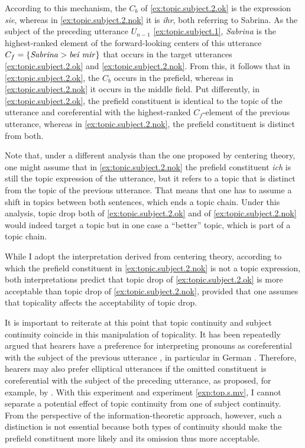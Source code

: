 According to this mechanism, the $C_b$ of \ref{ex:topic.subject.2.ok} is the expression \textit{sie}, whereas in \ref{ex:topic.subject.2.nok} it is \textit{ihr}, both referring to Sabrina.
As the subject of the preceding utterance $U_{n-1}$ \ref{ex:topic.subject.1}, \textit{Sabrina} is the highest-ranked element of the forward-looking centers of this utterance $C_f = \{\textrm{\textit{Sabrina}} > \textrm{\textit{bei mir}}\}$ that occurs in the target utterances \ref{ex:topic.subject.2.ok} and \ref{ex:topic.subject.2.nok}.
From this, it follows that in \ref{ex:topic.subject.2.ok}, the $C_b$ occurs in the prefield, whereas in \ref{ex:topic.subject.2.nok} it occurs in the middle field. 
Put differently, in \ref{ex:topic.subject.2.ok}, the prefield constituent is identical to the topic of the utterance and coreferential with the highest-ranked $C_f$-element of the previous utterance, whereas in \ref{ex:topic.subject.2.nok}, the prefield constituent is distinct from both.

Note that, under a different analysis than the one proposed by centering theory, one might assume that in \ref{ex:topic.subject.2.nok} the prefield constituent \textit{ich} is still the topic expression of the utterance, but it refers to a topic that is distinct from the topic of the previous utterance.
That means that one has to assume a shift in topics between both sentences, which ends a topic chain.
Under this analysis, topic drop both of \ref{ex:topic.subject.2.ok} and of \ref{ex:topic.subject.2.nok} would indeed target a topic but in one case a ``better'' topic, which is part of a topic chain.

While I adopt the interpretation derived from centering theory, according to which the prefield constituent in \ref{ex:topic.subject.2.nok} is not a topic expression, both interpretations predict that topic drop of \ref{ex:topic.subject.2.ok} is more acceptable than topic drop of \ref{ex:topic.subject.2.nok}, provided that one assumes that topicality affects the acceptability of topic drop.

It is important to reiterate at this point that topic continuity and subject continuity coincide in this manipulation of topicality.
It has been repeatedly argued that hearers have a preference for interpreting pronouns as coreferential with the subject of the previous utterance \citep[e.g.,][]{crawley.etal1990, jarvikivi.etal2005, kaiser2009}, in particular in German \citep[e.g.,][]{hemforth.etal2010, colonna.etal2012}.
Therefore, hearers may also prefer elliptical utterances if the omitted constituent is coreferential with the subject of the preceding utterance, as proposed, for example, by \citet[200]{auer1993}.
With this experiment and experiment \ref*{exp:top.s.mv}, I cannot separate a potential effect of topic continuity from one of subject continuity.
From the perspective of the information-theoretic approach, however, such a distinction is not essential because both types of continuity should make the prefield constituent more likely and its omission thus more acceptable.

